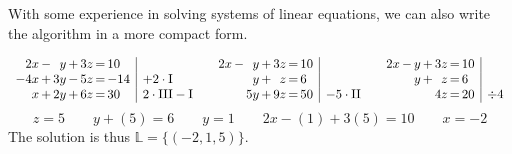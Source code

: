 \documentclass[12pt,eng]{skript_ogg}
\begin{document}
With some experience in solving systems of linear equations, we can also write the algorithm in a more compact form.
\begin{beispiel}
\[\begin{array}{r@{\,}c@{\,}r@{\,}c@{\,}r@{\,}c@{\,}l|l}
2x  & - & y  & + & 3z & = & 10 & \\
-4x & + & 3y & - & 5z & = & -14 & +2\cdot\mbox{I}\\
x   & + & 2y & + & 6z & = & 30 & 2\cdot\mbox{III}-\mbox{I}
\end{array}\quad\begin{array}{r@{\,}c@{\,}r@{\,}c@{\,}r@{\,}c@{\,}l|l}
2x & - & y & + & 3z & = & 10 & \\
 & & y & + & z & = & 6 & \\
 & & 5y & + & 9z & = & 50 & -5\cdot\mbox{II}
\end{array}\quad\begin{array}{r@{\,}c@{\,}r@{\,}c@{\,}r@{\,}c@{\,}l|l}
2x & - & y & + & 3z & = & 10 & \\
 & & y & + & z & = & 6 & \\
 & & & & 4z & = & 20 & \div4
\end{array}\]
\[z=5\qquad y+(5)=6\qquad y=1\qquad 2x-(1)+3(5)=10\qquad x=-2\]
The solution is thus $\mathbb{L}=\{(-2,1,5)\}$.
\end{beispiel}
\end{document}
